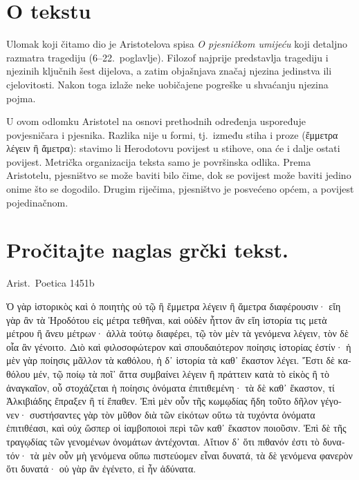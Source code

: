 
\section*{O tekstu}

Ulomak koji čitamo dio je Aristotelova spisa \textit{O pjesničkom umijeću} koji detaljno razmatra tragediju (6–22.\ poglavlje). Filozof najprije predstavlja tragediju i njezinih ključnih šest dijelova, a zatim objašnjava značaj njezina jedinstva ili cjelovitosti. Nakon toga izlaže neke uobičajene pogreške u shvaćanju njezina pojma.
 
U ovom odlomku Aristotel na osnovi prethodnih određenja uspoređuje povjesničara i pjesnika. Razlika nije u formi, tj.\ između stiha i proze \textgreek[variant=ancient]{(ἔμμετρα λέγειν ἢ ἄμετρα):} stavimo li Herodotovu povijest u stihove, ona će i dalje ostati povijest. Metrička organizacija teksta samo je površinska odlika. Prema Aristotelu, pjesništvo se može baviti bilo čime, dok se povijest može baviti jedino onime što se dogodilo. Drugim riječima, pjesništvo je posvećeno općem, a povijest pojedinačnom.


\section*{Pročitajte naglas grčki tekst.}

Arist.\ Poetica 1451b


\medskip


{\large

\begin{greek}

\noindent  Ὁ γὰρ ἱστορικὸς καὶ ὁ ποιητὴς οὐ τῷ ἢ ἔμμετρα λέγειν ἢ ἄμετρα διαφέρουσιν· εἴη γὰρ ἂν τὰ Ἡροδότου εἰς μέτρα τεθῆναι, καὶ οὐδὲν ἧττον ἂν εἴη ἱστορία τις μετὰ μέτρου ἢ ἄνευ μέτρων· ἀλλὰ τούτῳ διαφέρει, τῷ τὸν μὲν τὰ γενόμενα λέγειν, τὸν δὲ οἷα ἂν γένοιτο.  Διὸ καὶ φιλοσοφώτερον καὶ σπουδαιότερον ποίησις ἱστορίας ἐστίν· ἡ μὲν γὰρ ποίησις μᾶλλον τὰ καθόλου, ἡ δ᾿ ἱστορία τὰ καθ᾿ ἕκαστον λέγει. Ἔστι δὲ καθόλου μέν, τῷ ποίῳ τὰ ποῖ᾿ ἄττα συμβαίνει λέγειν ἢ πράττειν κατὰ τὸ εἰκὸς ἢ τὸ ἀναγκαῖον, οὗ στοχάζεται ἡ ποίησις ὀνόματα ἐπιτιθεμένη· τὰ δὲ καθ᾿ ἕκαστον, τί Ἀλκιβιάδης ἔπραξεν ἢ τί ἔπαθεν. Ἐπὶ μὲν οὖν τῆς κωμῳδίας ἤδη τοῦτο δῆλον γέγονεν· συστήσαντες γὰρ τὸν μῦθον διὰ τῶν εἰκότων οὕτω τὰ τυχόντα ὀνόματα ἐπιτιθέασι, καὶ οὐχ ὥσπερ οἱ ἰαμβοποιοὶ περὶ τῶν καθ᾿ ἕκαστον ποιοῦσιν. Ἐπὶ δὲ τῆς τραγῳδίας τῶν γενομένων ὀνομάτων ἀντέχονται. Αἴτιον δ᾿ ὅτι πιθανόν ἐστι τὸ δυνατόν· τὰ μὲν οὖν μὴ γενόμενα οὔπω πιστεύομεν εἶναι δυνατά, τὰ δὲ γενόμενα φανερὸν ὅτι δυνατά· οὐ γὰρ ἂν ἐγένετο, εἰ ἦν ἀδύνατα.

\end{greek}

}


